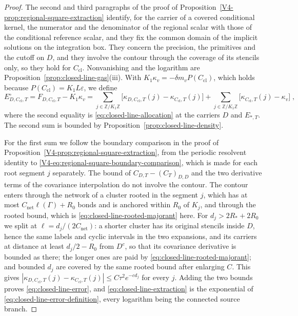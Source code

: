 \documentclass[11pt]{article}
\numberwithin{equation}{section}
\theoremstyle{remark}
\theoremstyle{plain}
\begin{document}
\begin{proof}
The second and third paragraphs of the proof of Proposition~\ref{V4-prop:regional-square-extraction} identify, for the carrier of a covered conditional kernel, the numerator and the denominator of the regional scalar with those of the conditional reference scalar, and they fix the common domain of the implicit solutions on the integration box. They concern the precision, the primitives and the cutoff on $D$, and they involve the contour through the coverage of its stencils only, so they hold for $C_{\mathrm{cl}}$. Nonvanishing and the logarithm are Proposition~\ref{prop:closed-line-gas}(iii). With $K_1\kappa_v=-\delta m_vP(C_{\mathrm{cl}})$, which holds because $P(C_{\mathrm{cl}})= K_1L\varepsilon$, we define
\begin{equation}\label{eq:closed-line-error-definition}
    E^{\circ}_{D,C_{\mathrm{cl}},T}= F_{D,C_{\mathrm{cl}},T}-K_1\kappa_v
        =\sum_{j\in\mathbb Z/K_1\mathbb Z}\bigl[\kappa_{D,C_{\mathrm{cl}},T}(j)-\kappa_{C_{\mathrm{cl}},T}(j)\bigr]
        +\sum_{j\in\mathbb Z/K_1\mathbb Z}\bigl[\kappa_{C_{\mathrm{cl}},T}(j)-\kappa_v\bigr]\;,
\end{equation}
where the second equality is \eqref{eq:closed-line-allocation} at the carriers $D$ and $E_{*,T}$. The second sum is bounded by Proposition~\ref{prop:closed-line-density}.

For the first sum we follow the boundary comparison in the proof of Proposition~\ref{V4-prop:regional-square-extraction}, from the periodic resolvent identity to \eqref{V4-eq:regional-square-boundary-comparison}, which is made for each root segment $j$ separately. The bound of $C_{D,T}-(C_T)_{D,D}$ and the two derivative terms of the covariance interpolation do not involve the contour. The contour enters through the network of a cluster rooted in the segment $j$, which has at most $C_{\mathrm{net}}\ell(\Gamma)+R_0$ bonds and is anchored within $R_0$ of $K_j$, and through the rooted bound, which is \eqref{eq:closed-line-rooted-majorant} here. For $d_j>2R_*+2R_0$ we split at $\ell= d_j/(2C_{\mathrm{net}})$: a shorter cluster has its original stencils inside $D$, hence the same labels and cyclic intervals in the two expansions, and its carriers at distance at least $d_j/2-R_0$ from $D^c$, so that its covariance derivative is bounded as there; the longer ones are paid by \eqref{eq:closed-line-rooted-majorant}; and bounded $d_j$ are covered by the same rooted bound after enlarging $C$. This gives $|\kappa_{D,C_{\mathrm{cl}},T}(j)-\kappa_{C_{\mathrm{cl}},T}(j)|\leqslant C\tau^2e^{-cd_j}$ for every $j$. Adding the two bounds proves \eqref{eq:closed-line-error}, and \eqref{eq:closed-line-extraction} is the exponential of \eqref{eq:closed-line-error-definition}, every logarithm being the connected source branch.
\end{proof}
\end{document}

